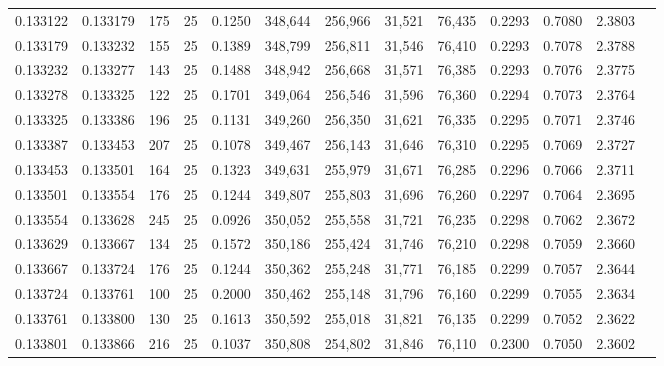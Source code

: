 \begin{tabular}{rrrrrrrrrrrrr}
0.133122 & 0.133179 &   175 &  25 &                                     0.1250 & 348,644 & 256,966 &  31,521 &  76,435 & 0.2293 & 0.7080 & 2.3803 \\
0.133179 & 0.133232 &   155 &  25 &                                     0.1389 & 348,799 & 256,811 &  31,546 &  76,410 & 0.2293 & 0.7078 & 2.3788 \\
0.133232 & 0.133277 &   143 &  25 &                                     0.1488 & 348,942 & 256,668 &  31,571 &  76,385 & 0.2293 & 0.7076 & 2.3775 \\
0.133278 & 0.133325 &   122 &  25 &                                     0.1701 & 349,064 & 256,546 &  31,596 &  76,360 & 0.2294 & 0.7073 & 2.3764 \\
0.133325 & 0.133386 &   196 &  25 &                                     0.1131 & 349,260 & 256,350 &  31,621 &  76,335 & 0.2295 & 0.7071 & 2.3746 \\
0.133387 & 0.133453 &   207 &  25 &                                     0.1078 & 349,467 & 256,143 &  31,646 &  76,310 & 0.2295 & 0.7069 & 2.3727 \\
0.133453 & 0.133501 &   164 &  25 &                                     0.1323 & 349,631 & 255,979 &  31,671 &  76,285 & 0.2296 & 0.7066 & 2.3711 \\
0.133501 & 0.133554 &   176 &  25 &                                     0.1244 & 349,807 & 255,803 &  31,696 &  76,260 & 0.2297 & 0.7064 & 2.3695 \\
0.133554 & 0.133628 &   245 &  25 &                                     0.0926 & 350,052 & 255,558 &  31,721 &  76,235 & 0.2298 & 0.7062 & 2.3672 \\
0.133629 & 0.133667 &   134 &  25 &                                     0.1572 & 350,186 & 255,424 &  31,746 &  76,210 & 0.2298 & 0.7059 & 2.3660 \\
0.133667 & 0.133724 &   176 &  25 &                                     0.1244 & 350,362 & 255,248 &  31,771 &  76,185 & 0.2299 & 0.7057 & 2.3644 \\
0.133724 & 0.133761 &   100 &  25 &                                     0.2000 & 350,462 & 255,148 &  31,796 &  76,160 & 0.2299 & 0.7055 & 2.3634 \\
0.133761 & 0.133800 &   130 &  25 &                                     0.1613 & 350,592 & 255,018 &  31,821 &  76,135 & 0.2299 & 0.7052 & 2.3622 \\
0.133801 & 0.133866 &   216 &  25 &                                     0.1037 & 350,808 & 254,802 &  31,846 &  76,110 & 0.2300 & 0.7050 & 2.3602 \\

\end{tabular}
